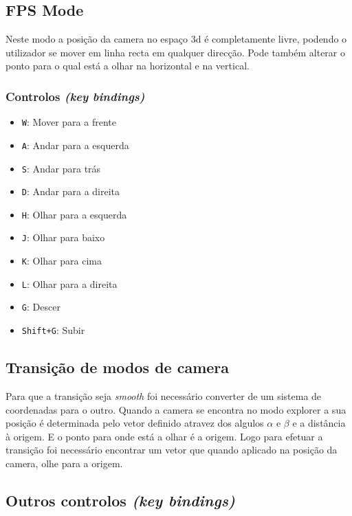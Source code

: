 \documentclass[a4paper]{article}
\begin{document}
\subsection{FPS Mode}

Neste modo a posição da camera no espaço 3d é completamente livre, podendo o utilizador se mover em linha recta em qualquer direcção. Pode também alterar o ponto para o qual está a olhar na horizontal e na vertical.
\subsubsection{Controlos \textit{(key bindings)}}

\begin{itemize}
    \item \texttt{W}: Mover para a frente
    \item \texttt{A}: Andar para a esquerda
    \item \texttt{S}: Andar para trás
    \item \texttt{D}: Andar para a direita
    \item \texttt{H}: Olhar para a esquerda
    \item \texttt{J}: Olhar para baixo
    \item \texttt{K}: Olhar para cima
    \item \texttt{L}: Olhar para a direita
    \item \texttt{G}: Descer
    \item \texttt{Shift+G}: Subir
\end{itemize}

\subsection{Transição de modos de camera}

Para que a transição seja \textit{smooth} foi necessário converter de um sistema de coordenadas para o outro. Quando a camera se encontra no modo explorer a sua posição é determinada pelo vetor definido atravez dos algulos $\alpha$ e $\beta$ e a distância à origem. E o ponto para onde está a olhar é a origem. Logo para efetuar a transição foi necessário encontrar um vetor que quando aplicado na posição da camera, olhe para a origem.

\subsection{Outros controlos \textit{(key bindings)}}
\end{document}

